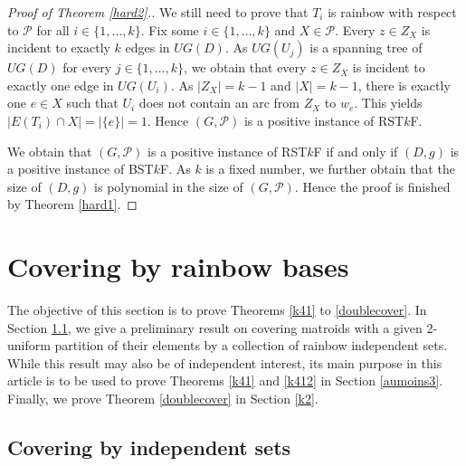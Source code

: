 \documentclass{article}
\begin{document}
\begin{proof}[Proof of Theorem \ref{hard2}.]
We still need to prove that $T_i$ is rainbow with respect to $\mathcal{P}$ for all $i \in \{1,\ldots,k\}$. Fix some $i \in \{1,\ldots,k\}$ and $X \in \mathcal{P}$.
 Every $z \in Z_X$ is incident to exactly $k$ edges in $UG(D)$. As $UG(U_j)$ is a spanning tree of $UG(D)$ for every $j \in \{1,\ldots,k\}$, we obtain that every $z \in Z_X$ is incident to exactly one edge in $UG(U_i)$. As $|Z_X|=k-1$ and $|X|=k-1$, there is exactly one $e \in X$ such that $U_i$ does not contain an arc from $Z_X$ to $w_e$. This yields $|E(T_i)\cap X|=|\{e\}|=1$.
 Hence $(G,\mathcal{P})$ is a positive instance of RST$k$F.
\medskip

We obtain that $(G,\mathcal{P})$ is a positive instance of RST$k$F if and only if $(D,g)$ is a positive instance of BST$k$F. As $k$ is a fixed number, we further obtain that the size of $(D,g)$ is polynomial in the size of $(G,\mathcal{P})$. Hence the proof is finished by Theorem \ref{hard1}.
\end{proof}

\section{Covering by rainbow bases}\label{cover}

The objective of this section is to prove Theorems \ref{k41} to \ref{doublecover}. In Section \ref{ind}, we give a preliminary result on covering matroids with a given 2-uniform partition of their elements by a collection of rainbow independent sets. While this result may also be of independent interest, its main purpose in this article is to be used to prove Theorems \ref{k41} and \ref{k412} in Section \ref{aumoins3}. Finally, we prove Theorem \ref{doublecover} in Section \ref{k2}.
\subsection{Covering by independent sets}\label{ind}
\end{document}
